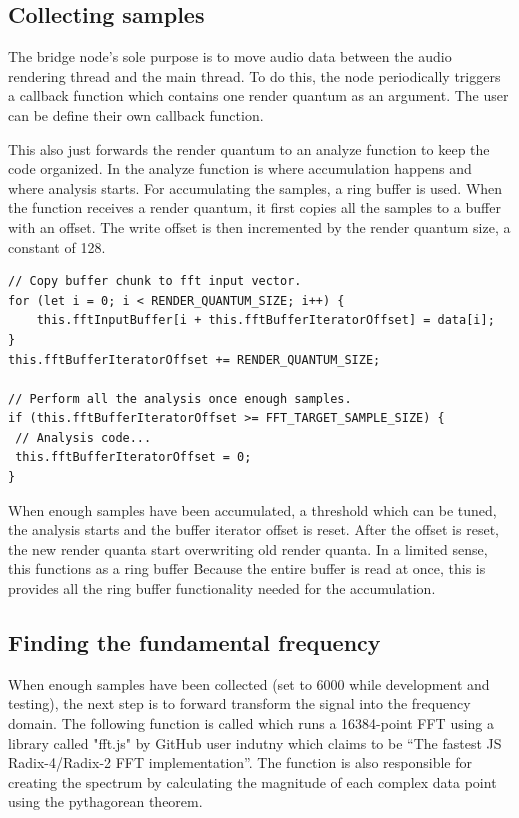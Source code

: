\subsection{Collecting samples}
The bridge node's sole purpose is to move audio data between the audio rendering thread and the main thread. To do this, the node periodically triggers a callback function which contains one render quantum as an argument. The user can be define their own callback function.

This also just forwards the render quantum to an analyze function to keep the code organized. In the analyze function is where accumulation happens and where analysis starts. For accumulating the samples, a ring buffer is used. When the function receives a render quantum, it first copies all the samples to a buffer with an offset. The write offset is then incremented by the render quantum size, a constant of 128.
\begin{lstlisting}[style=javascript]
// Copy buffer chunk to fft input vector.
for (let i = 0; i < RENDER_QUANTUM_SIZE; i++) {
    this.fftInputBuffer[i + this.fftBufferIteratorOffset] = data[i];
}
this.fftBufferIteratorOffset += RENDER_QUANTUM_SIZE;

// Perform all the analysis once enough samples.
if (this.fftBufferIteratorOffset >= FFT_TARGET_SAMPLE_SIZE) {
 // Analysis code...
 this.fftBufferIteratorOffset = 0;
}
\end{lstlisting}
When enough samples have been accumulated, a threshold which can be tuned, the analysis starts and the buffer iterator offset is reset. After the offset is reset, the new render quanta start overwriting old render quanta. In a limited sense, this functions as a ring buffer Because the entire buffer is read at once, this is provides all the ring buffer functionality needed for the accumulation. 

\subsection{Finding the fundamental frequency}
When enough samples have been collected (set to 6000 while development and testing), the next step is to forward transform the signal into the frequency domain. The following function is called which runs a 16384-point FFT using a library called "fft.js" by GitHub user indutny which claims to be “The fastest JS Radix-4/Radix-2 FFT implementation”. The function is also responsible for creating the spectrum by calculating the magnitude of each complex data point using the pythagorean theorem. 

